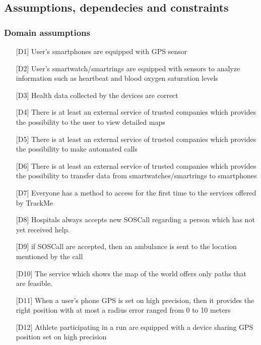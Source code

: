 \subsection{Assumptions, dependecies and constraints}

\subsubsection{Domain assumptions}
\begin{itemize}
\item[{[D1]}]  User's smartphones are equipped with GPS sensor
\item[{[D2]}] User's smartwatch/smartrings are equipped with sensors to analyze information such as heartbeat and blood oxygen saturation levels
\item[{[D3]}] Health data collected by the devices are correct
\item[{[D4]}] There is at least an external service of trusted companies which provides the possibility to the user to view detailed maps
\item[{[D5]}] There is at least an external service of trusted companies which provides the possibility to make automated calls
\item[{[D6]}] There is at least an external service of trusted companies which provides the possibility to transfer data from smartwatches/smartrings to smartphones
\item[{[D7]}] Everyone has a method to access for the first time to the services offered by TrackMe
\item[{[D8]}] Hospitals always accepts new SOSCall regarding a person which has not yet received help.
\item[{[D9]}] if SOSCall are accepted, then an ambulance is sent to the location mentioned by the call
\item[{[D10]}] The service which shows the map of the world offers only paths that are feasible.
\item[{[D11]}] When a user's phone GPS is set on high precision, then it provides the right position with at most a radius error ranged from 0 to 10 meters
\item[{[D12]}] Athlete participating in a run are equipped with a device sharing GPS position set on high precision
\end{itemize}
